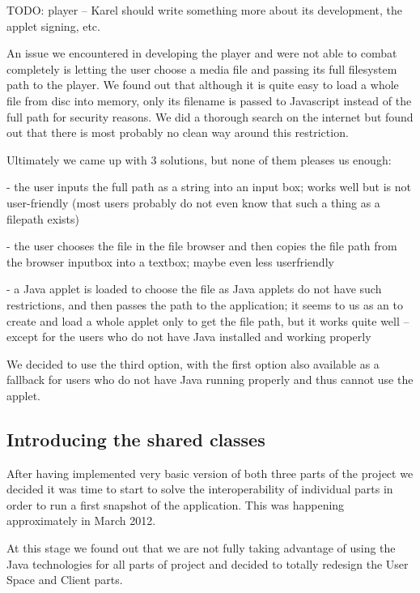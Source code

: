 TODO: player -- Karel should write something more about its development, the applet signing, etc.

An issue we encountered in developing the player and were not able to combat completely is letting the user choose a media file and passing its full filesystem path to the player. We found out that although it is quite easy to load a whole file from disc into memory, only its filename is passed to Javascript instead of the full path for security reasons. We did a thorough search on the internet but found out that there is most probably no clean way around this restriction.

Ultimately we came up with 3 solutions, but none of them pleases us enough:

- the user inputs the full path as a string into an input box; works well but is not user-friendly (most users probably do not even know that such a thing as a filepath exists)

- the user chooses the file in the file browser and then copies the file path from the browser inputbox into a textbox; maybe even less userfriendly

- a Java applet is loaded to choose the file as Java applets do not have such restrictions, and then passes the path to the application; it seems to us as an  to create and load a whole applet only to get the file path, but it works quite well -- except for the users who do not have Java installed and working properly

We decided to use the third option, with the first option also available as a fallback for users who do not have Java running properly and thus cannot use the applet.

\subsection{Introducing the shared classes}
\label{subsec:introducing_shared_classes}

After having implemented very basic version of both three parts of the project we decided it was time to start to solve the interoperability of individual parts in order to run a first snapshot of the application. This was happening approximately in March 2012.

At this stage we found out that we are not fully taking advantage of using the Java technologies for all parts of project and decided to totally redesign the User Space and Client parts.


